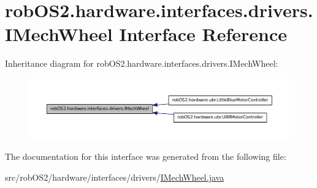 \hypertarget{interfacerob_o_s2_1_1hardware_1_1interfaces_1_1drivers_1_1_i_mech_wheel}{
\section{robOS2.hardware.interfaces.drivers.IMechWheel Interface Reference}
\label{interfacerob_o_s2_1_1hardware_1_1interfaces_1_1drivers_1_1_i_mech_wheel}
}


Inheritance diagram for robOS2.hardware.interfaces.drivers.IMechWheel:\nopagebreak
\begin{figure}[H]
\begin{center}
\leavevmode
\includegraphics[width=400pt]{interfacerob_o_s2_1_1hardware_1_1interfaces_1_1drivers_1_1_i_mech_wheel__inherit__graph}
\end{center}
\end{figure}


The documentation for this interface was generated from the following file:\begin{DoxyCompactItemize}
\item 
src/robOS2/hardware/interfaces/drivers/\hyperlink{_i_mech_wheel_8java}{IMechWheel.java}\end{DoxyCompactItemize}

